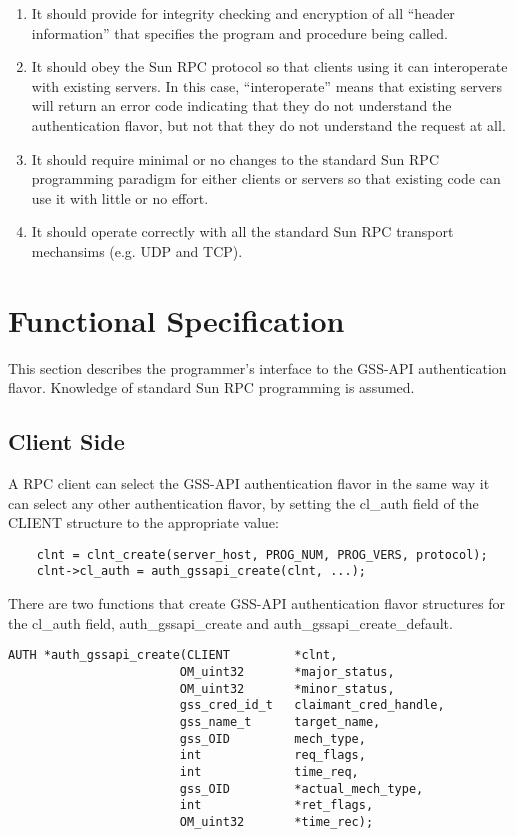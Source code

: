 \begin{enumerate}
\item It should provide for integrity checking and encryption of all
``header information'' that specifies the program and procedure being
called.

\item It should obey the Sun RPC protocol so that clients using
it can interoperate with existing servers.  In this case,
``interoperate'' means that existing servers will return an error code
indicating that they do not understand the authentication flavor, but
not that they do not understand the request at all.

\item It should require minimal or no changes to the standard Sun RPC
programming paradigm for either clients or servers so that existing
code can use it with little or no effort.

\item It should operate correctly with all the standard Sun RPC
transport mechansims (e.g. UDP and TCP).
\end{enumerate}

\section{Functional Specification}

This section describes the programmer's interface to the GSS-API
authentication flavor.   Knowledge of standard Sun RPC programming is
assumed.

\subsection{Client Side}

A RPC client can select the GSS-API authentication flavor in the same
way it can select any other authentication flavor, by setting the
cl_auth field of the CLIENT structure to the appropriate value:

\begin{verbatim}
    clnt = clnt_create(server_host, PROG_NUM, PROG_VERS, protocol);
    clnt->cl_auth = auth_gssapi_create(clnt, ...);
\end{verbatim}

There are two functions that create GSS-API authentication flavor
structures for the cl_auth field, auth_gssapi_create and
auth_gssapi_create_default.

\begin{verbatim}
AUTH *auth_gssapi_create(CLIENT         *clnt,
                        OM_uint32       *major_status,
                        OM_uint32       *minor_status,
                        gss_cred_id_t   claimant_cred_handle,
                        gss_name_t      target_name,
                        gss_OID         mech_type,
                        int             req_flags,
                        int             time_req,
                        gss_OID         *actual_mech_type,
                        int             *ret_flags,
                        OM_uint32       *time_rec);
\end{verbatim}

